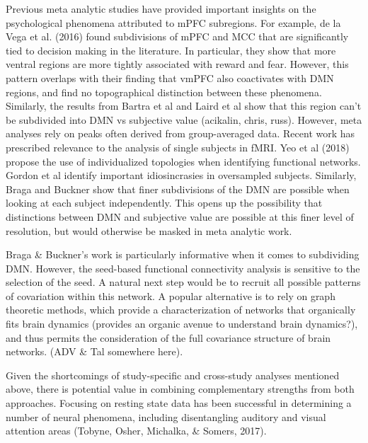\documentclass[9pt,twocolumn,twoside,]{pnas-new}
\begin{document}
Previous meta analytic studies have provided important insights on the
psychological phenomena attributed to mPFC subregions. For example, de
la Vega et al. (2016) found subdivisions of mPFC and MCC that are
significantly tied to decision making in the literature. In particular,
they show that more ventral regions are more tightly associated with
reward and fear. However, this pattern overlaps with their finding that
vmPFC also coactivates with DMN regions, and find no topographical
distinction between these phenomena. Similarly, the results from Bartra
et al and Laird et al show that this region can't be subdivided into DMN
vs subjective value (acikalin, chris, russ). However, meta analyses rely
on peaks often derived from group-averaged data. Recent work has
prescribed relevance to the analysis of single subjects in fMRI. Yeo et
al (2018) propose the use of individualized topologies when identifying
functional networks. Gordon et al identify important idiosincrasies in
oversampled subjects. Similarly, Braga and Buckner show that finer
subdivisions of the DMN are possible when looking at each subject
independently. This opens up the possibility that distinctions between
DMN and subjective value are possible at this finer level of resolution,
but would otherwise be masked in meta analytic work.

Braga \& Buckner's work is particularly informative when it comes to
subdividing DMN. However, the seed-based functional connectivity
analysis is sensitive to the selection of the seed. A natural next step
would be to recruit all possible patterns of covariation within this
network. A popular alternative is to rely on graph theoretic methods,
which provide a characterization of networks that organically fits brain
dynamics (provides an organic avenue to understand brain dynamics?), and
thus permits the consideration of the full covariance structure of brain
networks. (ADV \& Tal somewhere here).

Given the shortcomings of study-specific and cross-study analyses
mentioned above, there is potential value in combining complementary
strengths from both approaches. Focusing on resting state data has been
successful in determining a number of neural phenomena, including
disentangling auditory and visual attention areas (Tobyne, Osher,
Michalka, \& Somers, 2017).
\end{document}
